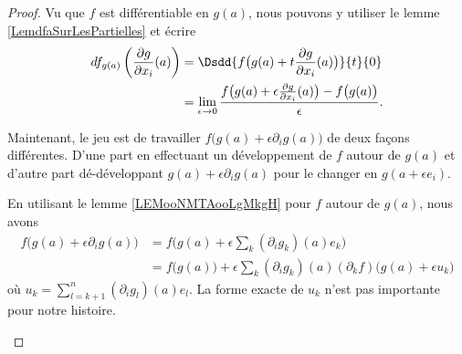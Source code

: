 \begin{proof}
	Vu que \( f\) est différentiable en \( g(a)\), nous pouvons y utiliser le lemme \ref{LemdfaSurLesPartielles} et écrire
    \begin{subequations}   \label{EQooFZBVooTwNexc}
        \begin{align}
		df_{g(a)}\left( \frac{ \partial g }{ \partial x_i }(a) \right)&=\Dsdd{ f\big( g(a)+t\frac{ \partial g }{ \partial x_i }(a) \big) }{t}{0}\\
		&=\lim_{\epsilon\to 0}\frac{ f\big( g(a)+\epsilon\frac{ \partial g }{ \partial x_i }(a) \big)-f\big( g(a) \big) }{ \epsilon }.
        \end{align}
    \end{subequations}

	Maintenant, le jeu est de travailler \( f\big( g(a)+\epsilon\partial_ig(a) \big)\) de deux façons différentes. D'une part en effectuant un développement de \( f\) autour de \( g(a)\) et d'autre part dé-développant \( g(a)+\epsilon\partial_ig(a)\) pour le changer en \( g(a+\epsilon e_i)\).

	\begin{subproof}
		\spitem[Développer \( f\)]
		En utilisant le lemme \ref{LEMooNMTAooLgMkgH} pour \( f\) autour de \( g(a)\), nous avons
		\begin{subequations}
			\begin{align}
				f\big( g(a)+\epsilon\partial_ig(a) \big) & =f\big( g(a)+\epsilon\sum_k(\partial_ig_k)(a)e_k \big)                                      \\
				                                         & =f\big( g(a) \big)+\epsilon\sum_k(\partial_ig_k)(a)(\partial_kf)\big(g(a)+\epsilon u_k\big)
			\end{align}
		\end{subequations}
		où \( u_k=\sum_{l=k+1}^n(\partial_ig_l)(a)e_l\). La forme exacte de \( u_k\) n'est pas importante pour notre histoire.


\end{subproof}
\end{proof}
